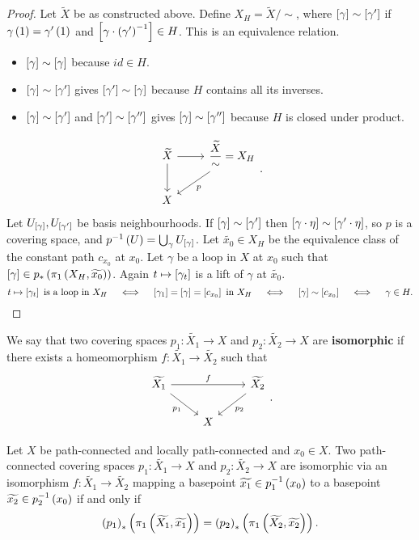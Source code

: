 \begin{proof}
Let $ \widetilde{X} $ be as constructed above. Define $ X_H = \widetilde{X} / \sim $, where $ \sb{\gamma} \sim \sb{\gamma'} $ if $ \gamma\rb{1} = \gamma'\rb{1} $ and $ \sb{\gamma \cdot \rb{\gamma'}^{-1}} \in H $. This is an equivalence relation.
\begin{itemize}
\item $ \sb{\gamma} \sim \sb{\gamma} $ because $ id \in H $.
\item $ \sb{\gamma} \sim \sb{\gamma'} $ gives $ \sb{\gamma'} \sim \sb{\gamma} $ because $ H $ contains all its inverses.
\item $ \sb{\gamma} \sim \sb{\gamma'} $ and $ \sb{\gamma'} \sim \sb{\gamma''} $ gives $ \sb{\gamma} \sim \sb{\gamma''} $ because $ H $ is closed under product.
\end{itemize}
$$
\begin{tikzcd}
\widetilde{X} \arrow{r} \arrow{d} & \dfrac{\widetilde{X}}{\sim} = X_H \arrow{dl}{p} \\
X &
\end{tikzcd}.
$$
Let $ U_{\sb{\gamma}}, U_{\sb{\gamma'}} $ be basis neighbourhoods. If $ \sb{\gamma} \sim \sb{\gamma'} $ then $ \sb{\gamma \cdot \eta} \sim \sb{\gamma' \cdot \eta} $, so $ p $ is a covering space, and $ p^{-1}\rb{U} = \bigcup_\gamma U_{\sb{\gamma}} $. Let $ \widetilde{x_0} \in X_H $ be the equivalence class of the constant path $ c_{x_0} $ at $ x_0 $. Let $ \gamma $ be a loop in $ X $ at $ x_0 $ such that $ \sb{\gamma} \in p_*\rb{\pi_1\rb{X_H, \widetilde{x_0}}} $. Again $ t \mapsto \sb{\gamma_t} $ is a lift of $ \gamma $ at $ \widetilde{x_0} $.
$$ t \mapsto \sb{\gamma_t} \ \text{is a loop in} \ X_H \quad \iff \quad \sb{\gamma_1} = \sb{\gamma} = \sb{c_{x_0}} \ \text{in} \ X_H \quad \iff \quad \sb{\gamma} \sim \sb{c_{x_0}} \quad \iff \quad \gamma \in H. $$
\end{proof}

\begin{definition*}
We say that two covering spaces $ p_1 : \widetilde{X_1} \to X $ and $ p_2 : \widetilde{X_2} \to X $ are \textbf{isomorphic} if there exists a homeomorphism $ f : \widetilde{X_1} \to \widetilde{X_2} $ such that
$$
\begin{tikzcd}
\widetilde{X_1} \arrow{rr}{f} \arrow[swap]{dr}{p_1} & & \widetilde{X_2} \arrow{dl}{p_2} \\
& X &
\end{tikzcd}.
$$
\end{definition*}

\begin{proposition}
\label{prop:1.37}
Let $ X $ be path-connected and locally path-connected and $ x_0 \in X $. Two path-connected covering spaces $ p_1 : \widetilde{X_1} \to X $ and $ p_2 : \widetilde{X_2} \to X $ are isomorphic via an isomorphism $ f : \widetilde{X_1} \to \widetilde{X_2} $ mapping a basepoint $ \widetilde{x_1} \in p_1^{-1}\rb{x_0} $ to a basepoint $ \widetilde{x_2} \in p_2^{-1}\rb{x_0} $ if and only if
$$ \rb{p_1}_*\rb{\pi_1\rb{\widetilde{X_1}, \widetilde{x_1}}} = \rb{p_2}_*\rb{\pi_1\rb{\widetilde{X_2}, \widetilde{x_2}}}. $$
\end{proposition}

